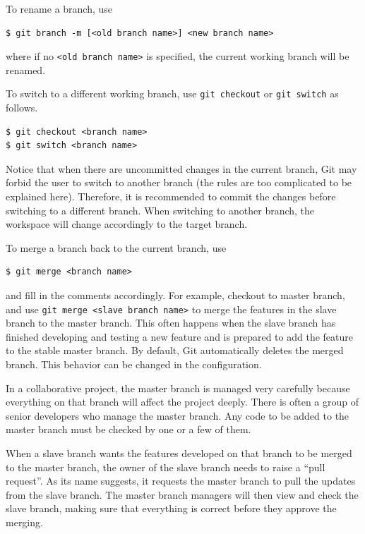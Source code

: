 To rename a branch, use
\begin{lstlisting}
$ git branch -m [<old branch name>] <new branch name>
\end{lstlisting}
where if no \verb|<old branch name>| is specified, the current working branch will be renamed.

To switch to a different working branch, use \verb|git checkout| or \verb|git switch| as follows.
\begin{lstlisting}
$ git checkout <branch name>
$ git switch <branch name>
\end{lstlisting}
Notice that when there are uncommitted changes in the current branch, Git may forbid the user to switch to another branch (the rules are too complicated to be explained here). Therefore, it is recommended to commit the changes before switching to a different branch. When switching to another branch, the workspace will change accordingly to the target branch.

To merge a branch back to the current branch, use
\begin{lstlisting}
$ git merge <branch name>
\end{lstlisting}
and fill in the comments accordingly. For example, checkout to master branch, and use \verb|git merge <slave branch name>| to merge the features in the slave branch to the master branch. This often happens when the slave branch has finished developing and testing a new feature and is prepared to add the feature to the stable master branch. By default, Git automatically deletes the merged branch. This behavior can be changed in the configuration.

\begin{shortbox}

In a collaborative project, the master branch is managed very carefully because everything on that branch will affect the project deeply. There is often a group of senior developers who manage the master branch. Any code to be added to the master branch must be checked by one or a few of them.

When a slave branch wants the features developed on that branch to be merged to the master branch, the owner of the slave branch needs to raise a ``pull request''. As its name suggests, it requests the master branch to pull the updates from the slave branch. The master branch managers will then view and check the slave branch, making sure that everything is correct before they approve the merging.

\end{shortbox}

